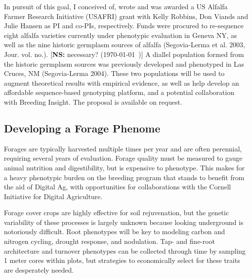 \documentclass[11pt]{article}
\newcommand{\nicholas}[1]{{\color{nicholasCol} [\textbf{NS:} #1 (\today\ \currenttime)]}}
\begin{document}


In pursuit of this goal, I conceived of, wrote and was awarded a US Alfalfa Farmer Research Initiative (USAFRI) grant with Kelly Robbins, Don Viands and Julie Hansen as PI and co-PIs, respectively. Funds were procured to re-sequence eight alfalfa varieties currently under phenotypic evaluation in Geneva NY, as well as the nine historic germplasm sources of alfalfa (Segovia-Lerma et al. 2003, Jour. vol. no.). \nicholas{necessary?} A diallel population formed from the historic germplasm sources was previously developed and phenotyped in Las Cruces, NM (Segovia-Lerma 2004). These two populations will be used to augment theoretical results with empirical evidence, as well as help develop an affordable sequence-based genotyping platform, and a potential collaboration with Breeding Insight. The proposal is available on request. 


\subsection*{Developing a Forage Phenome}

Forages are typically harvested multiple times per year and are often perennial, requiring several years of evaluation. Forage quality must be measured to gauge animal nutrition and digestibility, but is expensive to phenotype. This makes for a heavy phenotypic burden on the breeding program that stands to benefit from the aid of Digital Ag, with opportunities for collaborations with the Cornell Initiative for Digital Agriculture.

Forage cover crops are highly effective for soil rejuvenation, but the genetic variability of these processes is largely unknown because looking underground is notoriously difficult. Root phenotypes will be key to modeling carbon and nitrogen cycling, drought response, and nodulation. Tap- and fine-root architecture and turnover phenotypes can be collected through time by sampling 1 meter cores within plots, but strategies to economically select for these traits are desperately needed. %
\end{document}
